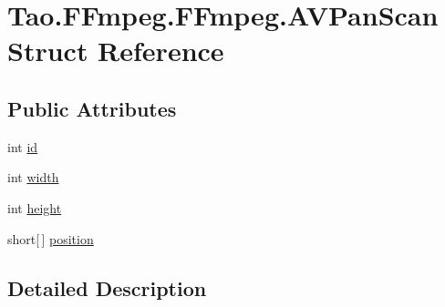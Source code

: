 \hypertarget{struct_tao_1_1_f_fmpeg_1_1_f_fmpeg_1_1_a_v_pan_scan}{
\section{Tao.FFmpeg.FFmpeg.AVPanScan Struct Reference}
\label{struct_tao_1_1_f_fmpeg_1_1_f_fmpeg_1_1_a_v_pan_scan}
}
\subsection*{Public Attributes}
\begin{DoxyCompactItemize}
\item 
int \hyperlink{struct_tao_1_1_f_fmpeg_1_1_f_fmpeg_1_1_a_v_pan_scan_a7b94b0066e2b134cdb1a9f2ba98085b0}{id}
\item 
int \hyperlink{struct_tao_1_1_f_fmpeg_1_1_f_fmpeg_1_1_a_v_pan_scan_a5b6b3ba6fed75218cebb4edd6113643a}{width}
\item 
int \hyperlink{struct_tao_1_1_f_fmpeg_1_1_f_fmpeg_1_1_a_v_pan_scan_a7273d0baeb1d6fcca7fd900f897752f2}{height}
\item 
short\mbox{[}$\,$\mbox{]} \hyperlink{struct_tao_1_1_f_fmpeg_1_1_f_fmpeg_1_1_a_v_pan_scan_a68e2810434264ddda26437a4dacd3478}{position}
\end{DoxyCompactItemize}


\subsection{Detailed Description}


